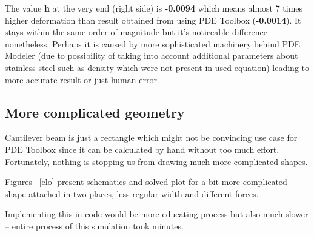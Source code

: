 \documentclass[12pt]{article}
\begin{document}
The value \textbf{h} at the very end (right side) is \textbf{-0.0094} which means almost 7 times higher deformation than result obtained from using PDE Toolbox (\textbf{-0.0014}). It stays within the same order of magnitude but it's noticeable difference nonetheless. Perhaps it is caused by more sophisticated machinery behind PDE Modeler (due to possibility of taking into account additional parameters about stainless steel such as density which were not present in used equation) leading to more accurate result or just human error.

\subsection{More complicated geometry}
Cantilever beam is just a rectangle which might not be convincing use case for PDE Toolbox since it can be calculated by hand without too much effort. Fortunately, nothing is stopping us from drawing much more complicated shapes.

Figures ~\ref{elo} present schematics and solved plot for a bit more complicated shape attached in two places, less regular width and different forces.

Implementing this in code would be more educating process but also much slower -- entire process of this simulation took minutes.
\end{document}
